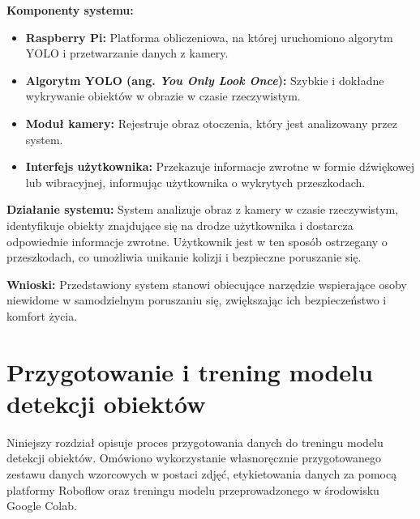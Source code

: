 \documentclass[a4paper,twoside,12pt]{book}
\newtheorem{Definition}{Definicja}
\newtheorem{Example}{Przykład}
\newtheorem{Theorem}{Twierdzenie}
\begin{document}
\textbf{Komponenty systemu:}
\begin{itemize}
    \item \textbf{Raspberry Pi:} Platforma obliczeniowa, na której uruchomiono algorytm YOLO i przetwarzanie danych z kamery.
    \item \textbf{Algorytm YOLO (ang. \textit{You Only Look Once}):} Szybkie i dokładne wykrywanie obiektów w obrazie w czasie rzeczywistym.
    \item \textbf{Moduł kamery:} Rejestruje obraz otoczenia, który jest analizowany przez system.
    \item \textbf{Interfejs użytkownika:} Przekazuje informacje zwrotne w formie dźwiękowej lub wibracyjnej, informując użytkownika o wykrytych przeszkodach.
\end{itemize}

\textbf{Działanie systemu:}
System analizuje obraz z kamery w czasie rzeczywistym, identyfikuje obiekty znajdujące się na drodze użytkownika i dostarcza odpowiednie informacje zwrotne. Użytkownik jest w ten sposób ostrzegany o przeszkodach, co umożliwia unikanie kolizji i bezpieczne poruszanie się.

\textbf{Wnioski:}
Przedstawiony system stanowi obiecujące narzędzie wspierające osoby niewidome w samodzielnym poruszaniu się, zwiększając ich bezpieczeństwo i komfort życia. 

%
%





\chapter{Przygotowanie i trening modelu detekcji obiektów}
\label{ch:Przygotowanie-i-trening-modelu}
Niniejszy rozdział opisuje proces przygotowania danych do treningu modelu detekcji obiektów. Omówiono wykorzystanie własnoręcznie przygotowanego zestawu danych wzorcowych w postaci zdjęć, etykietowania danych za pomocą platformy Roboflow oraz treningu modelu przeprowadzonego w środowisku Google Colab.
\end{document}
